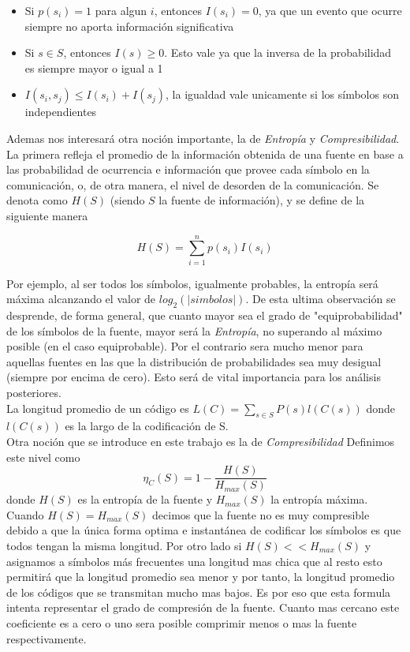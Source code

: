 \begin{itemize}
	\item Si $p(s_i) = 1$ para algun $i$, entonces $I(s_i) = 0$, ya que un evento que ocurre siempre no aporta información significativa
	\item Si $s \in S$, entonces $I(s) \geq 0$. Esto vale ya que la inversa de la probabilidad es siempre mayor o igual a 1
	\item $I(s_i, s_j) \leq I(s_i) + I(s_j)$, la igualdad vale unicamente si los símbolos son independientes
	
\end{itemize}

Ademas nos interesará otra noción importante, la de \textit{Entropía} y
\textit{Compresibilidad}. La primera refleja el promedio de la información
obtenida de una fuente en base a las probabilidad de ocurrencia e información
que provee cada símbolo en la comunicación, o, de otra manera, el nivel de
desorden de la comunicación.  Se denota como $H(S)$ (siendo $S$ la fuente de
información), y se define de la siguiente manera 

\begin{equation}
	H(S) = \sum\limits_{i=1}^n p(s_i)I(s_i)
\end{equation}

Por ejemplo, al ser todos los símbolos, igualmente probables,
la entropía será máxima alcanzando el valor de $log_2(\lvert simbolos\rvert)$.
De esta ultima observación se desprende, de forma general, que cuanto mayor sea el grado de
"equiprobabilidad" de los símbolos de la fuente, mayor será la
\textit{Entropía}, no superando al máximo posible (en el caso equiprobable).
Por el contrario sera mucho menor para aquellas fuentes en las
que la distribución de probabilidades sea muy desigual (siempre por encima de cero).
Esto será de vital importancia para los análisis posteriores.
\\

La longitud promedio de un código es $L(C) = \sum_{s \in S} P(s)l(C(s))$ donde
$l(C(s))$ es la largo de la codificación de S.
\\

Otra noción que se introduce en este trabajo es la de \textit{Compresibilidad}
Definimos este nivel como
\begin{equation}
\eta_{C}(S)=1-\frac{H(S)}{H_{max}(S)}
\end{equation}donde $H(S)$ es la entropía de la
fuente y $H_{max}(S)$ la entropía máxima. Cuando $H(S) = H_{max}(S)$ decimos que
la fuente no es muy compresible debido a que la única forma optima e instantánea
de codificar los símbolos es que todos tengan la misma longitud. Por otro lado
si $H(S) << H_{max}(S)$ y asignamos a símbolos más frecuentes
una longitud mas chica que al resto esto permitirá que la longitud promedio
sea menor y por tanto, la longitud promedio de los códigos que se transmitan
mucho mas bajos.
Es por eso que esta formula intenta representar el grado de compresión de la fuente.
Cuanto mas cercano este coeficiente es a cero o uno sera posible comprimir menos
o mas la fuente respectivamente.


